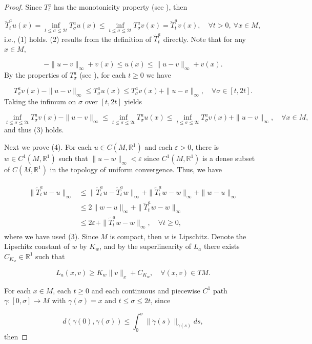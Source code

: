 \documentclass{amsart}[12pt]
\theoremstyle{definition}
\theoremstyle{remark}
\numberwithin{equation}{section}
\begin{document}
\begin{proof}
Since $T^a_t$ has the monotonicity property (see \cite[Corollary 4.4.4]{Fat-b}),
then

\[
\tilde{T}^a_tu(x)=\inf_{t\leq \sigma\leq 2t}T^a_\sigma u(x)\leq\inf_{t\leq
\sigma\leq 2t}T^a_\sigma v(x)=\tilde{T}^a_tv(x), \quad \forall t>0, \ \forall
x\in M,
\]
i.e., (1) holds. (2) results from the definition of
$\tilde{T}^a_t$ directly. Note that for any $x\in M$,

\[
-\|u-v\|_\infty+v(x)\leq u(x)\leq\|u-v\|_\infty+v(x).
\]
By the properties of $T^a_\sigma$ (see \cite[Corollary 4.4.4]{Fat-b}),
for each $t\geq 0$ we have

\[
T^a_\sigma v(x)-\|u-v\|_\infty\leq T^a_\sigma u(x)\leq
T^a_\sigma v(x)+\|u-v\|_\infty, \quad \forall \sigma\in[t,2t].
\]
Taking the infimum on $\sigma$ over $[t,2t]$ yields

\[
\inf_{t\leq \sigma\leq 2t}T^a_\sigma v(x)-\|u-v\|_\infty\leq\inf_{t\leq \sigma\leq
2t}T^a_\sigma u(x)\leq\inf_{t\leq \sigma\leq 2t}T^a_\sigma v(x)+\|u-v\|_\infty,
\quad \forall x\in M,
\]
and thus (3) holds.

Next we prove (4). For each $u\in C(M,\mathbb{R}^1)$ and each
$\varepsilon>0$, there is $w\in C^1(M,\mathbb{R}^1)$ such that
$\|u-w\|_\infty<\varepsilon$ since $C^1(M,\mathbb{R}^1)$ is a
dense subset of $C(M,\mathbb{R}^1)$ in the topology of uniform
convergence. Thus, we have

\begin{align}\label{4-1}
\begin{split}
\|\tilde{T}^a_tu-u\|_\infty &
\leq\|\tilde{T}^a_tu-\tilde{T}^a_tw\|_\infty
+\|\tilde{T}^a_tw-w\|_\infty+\|w-u\|_\infty\\
&\leq 2\|w-u\|_\infty+\|\tilde{T}^a_tw-w\|_\infty\\
&\leq 2\varepsilon+\|\tilde{T}^a_tw-w\|_\infty, \quad \forall
t\geq 0,
\end{split}
\end{align}
where we have used (3). Since $M$ is compact, then $w$ is
Lipschitz. Denote the Lipschitz constant of $w$ by $K_w$, and by
the superlinearity of $L_a$ there exists $C_{K_w}\in\mathbb{R}^1$
such that

\[
L_a(x,v)\geq K_w\|v\|_x+C_{K_w}, \quad \forall(x,v)\in TM.
\]

For each $x\in M$, each $t\geq 0$ and each continuous and piecewise
$C^1$ path $\gamma:[0,\sigma]\to M$ with $\gamma(\sigma)=x$ and $t\leq \sigma\leq
2t$, since

\[
d(\gamma(0),\gamma(\sigma))\leq\int_0^\sigma\|\dot{\gamma}(s)\|_{\gamma(s)}ds,
\]
then


\end{proof}
\end{document}
